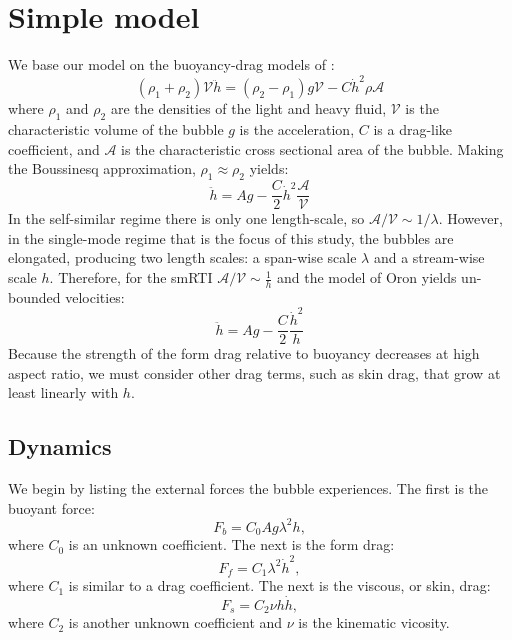 \section{Simple model} 

We base our model on the buoyancy-drag models of \cite{Oron2001}:
\begin{equation}
(\rho_1 + \rho_2) \mathcal{V} \ddot{h} = (\rho_2 - \rho_1) g \mathcal{V} - C \dot{h}^2 \rho \mathcal{A}
\end{equation}
where $\rho_1$ and $\rho_2$ are the densities of the light and heavy fluid,
$\mathcal{V}$ is the characteristic volume of the bubble
$g$ is the acceleration,
$C$ is a drag-like coefficient, and
$\mathcal{A}$ is the characteristic cross sectional area of the bubble.
Making the Boussinesq approximation, $\rho_1 \approx \rho_2$ yields:
\begin{equation}
\ddot{h} = A g - \frac{C}{2} \dot{h}^2 \frac{\mathcal{A}}{\mathcal{V}}
\end{equation}
In the self-similar regime there is only one length-scale, so $\mathcal{A}/\mathcal{V} \sim 1 / \lambda$.
However, in the single-mode regime that is the focus of this study, the bubbles are elongated, producing two length scales: a span-wise scale $\lambda$ and a stream-wise scale $h$.
Therefore, for the smRTI $\mathcal{A}/\mathcal{V} \sim \frac{1}{h}$ and the model of Oron \etal yields un-bounded velocities:
\begin{equation}
\ddot{h} = A g - \frac{C}{2} \frac{\dot{h}^2}{h}
\end{equation}
Because the strength of the form drag relative to buoyancy decreases at high aspect ratio, we must consider other drag terms, such as skin drag, that grow at least linearly with $h$.

\subsection{Dynamics}

We begin by listing the external forces the bubble experiences.  The first is the buoyant force:
\begin{equation}
F_b = C_0 A g \lambda^2 h,
\end{equation}
where $C_0$ is an unknown coefficient.
The next is the form drag:
\begin{equation}
F_f = C_1 \lambda^2 \dot{h}^2,
\end{equation}
where $C_1$ is similar to a drag coefficient.
The next is the viscous, or skin, drag:
\begin{equation}
F_s = C_2 \nu h \dot{h},
\end{equation}
where $C_2$ is another unknown coefficient and 
$\nu$ is the kinematic vicosity.

